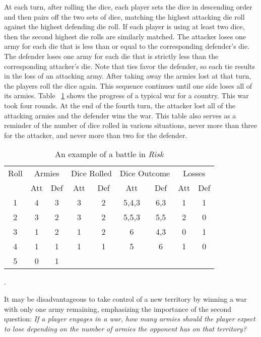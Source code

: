 \documentclass[12pt]{article}
\begin{document}
At each turn, after rolling the dice, each player sets the dice in
descending order and then pairs off the two sets of dice, matching the
highest attacking die roll against the highest defending die roll.  If
each player is using at least two dice, then the second highest die
rolls are similarly matched.  The attacker loses one army for each die
that is less than or equal to the corresponding defender's die.  The
defender loses one army for each die that is strictly less than the
corresponding attacker's die.  Note that ties favor the defender, so
each tie results in the loss of an attacking army.  After taking away
the armies lost at that turn, the players roll the dice again.  This
sequence continues until one side loses all of its armies.  Table~%
\ref{tab:riskgame:riskwar} shows the progress of a typical war for a
country.  This war took four rounds.  At the end of the fourth turn, the
attacker lost all of the attacking armies and the defender wins the war.
This table also serves as a reminder of the number of dice rolled in
various situations, never more than three for the attacker, and never
more than two for the defender.
\begin{table}
    \centering
    \begin{tabular}{ccccccccc}
        Roll & \multicolumn{2}{c}{Armies} & \multicolumn{2}{c}{Dice Rolled} & \multicolumn{2}{c}{Dice Outcome} & \multicolumn{2}{c}{Losses} \\ 
             & Att      & Def      & Att      & Def      & Att   & Def & Att & Def \\ 
        1    & 4        & 3        & 3        & 2        & 5,4,3 & 6,3 & 1   & 1   \\ 
        2    & 3        & 2        & 3        & 2        & 5,5,3 & 5,5 & 2   & 0   \\ 
        3    & 1        & 2        & 1        & 2        & 6     & 4,3 & 0   & 1   \\ 
        4    & 1        & 1        & 1        & 1        & 5     & 6   & 1   & 0   \\ 
        5    & 0        & 1        &          &          &       &     &     &     \\ 
    \end{tabular}
    \caption{An example of a battle in \emph{Risk}}.%
    \label{tab:riskgame:riskwar}
\end{table}

It may be disadvantageous to take control of a new territory by winning
a war with only one army remaining, emphasizing the importance of the
second question:  \emph{If a player engages in a war, how many armies
should the player expect to lose depending on the number of armies the
opponent has on that territory?}
\end{document}

